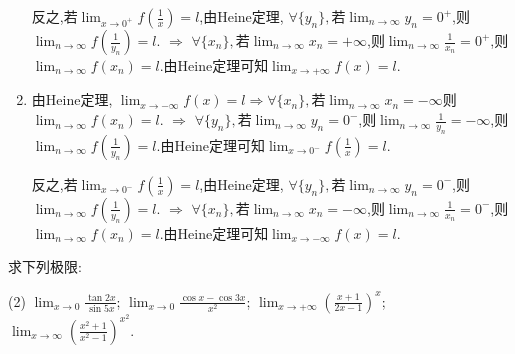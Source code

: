 \begin{solution}
\begin{enumerate}[(1)]
              反之,若$\lim_{x \to 0^+} f\left(\frac{1}{x}\right)=l$,由Heine定理, $\forall \{y_n\}, $若$\lim_{n \to \infty} y_n = 0^+$,则$\lim_{n \to \infty} f\left( \frac{1}{y_n} \right) = l$. $\Rightarrow$ $\forall \{x_n\}, $若$\lim_{n \to \infty} x_n = +\infty$,则$\lim_{n \to \infty} \frac{1}{x_n} = 0^+$,则$\lim_{n \to \infty} f(x_n) = l$.由Heine定理可知$\lim_{x \to +\infty} f(x) = l$.

        \item 由Heine定理, $\lim_{x \to -\infty} f(x) = l \Rightarrow \forall \{x_n\}, $若$\lim_{n \to \infty} x_n = -\infty$则$\lim_{n \to \infty} f(x_n) = l$. $\Rightarrow$ $\forall \{ y_n \}, $若$\lim_{n \to \infty} y_n = 0^-$,则$\lim_{n \to \infty} \frac{1}{y_n} = -\infty$,则$\lim_{n \to \infty} f\left( \frac{1}{y_n} \right) = l$.由Heine定理可知$\lim_{x \to 0^-} f\left(\frac{1}{x}\right)=l$.

              反之,若$\lim_{x \to 0^-} f\left(\frac{1}{x}\right)=l$,由Heine定理, $\forall \{y_n\}, $若$\lim_{n \to \infty} y_n = 0^-$,则$\lim_{n \to \infty} f\left( \frac{1}{y_n} \right) = l$. $\Rightarrow$ $\forall \{x_n\}, $若$\lim_{n \to \infty} x_n = -\infty$,则$\lim_{n \to \infty} \frac{1}{x_n} = 0^-$,则$\lim_{n \to \infty} f(x_n) = l$.由Heine定理可知$\lim_{x \to -\infty} f(x) = l$.
    \end{enumerate}
\end{solution}

\begin{exercise}[1.3.9]
    求下列极限:
    \begin{tasks}[label=(\arabic*)](2)
        \task $\lim_{x \to 0} \frac{\tan 2x}{\sin 5x}$;
        \task $\lim_{x \to 0} \frac{\cos x - \cos 3x}{x^2}$;
        \task $\lim_{x \to +\infty} \left(\frac{x+1}{2x-1}\right)^x$;
        \task $\lim_{x \to \infty} \left(\frac{x^2+1}{x^2-1}\right)^{x^2}$.
    \end{tasks}
\end{exercise}

